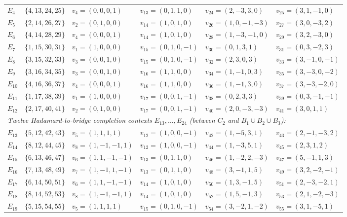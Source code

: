\documentclass[aps,pra,reprint,superscriptaddress,longbibliography,nofootinbib,floatfix,10pt]{revtex4-2}
\theoremstyle{definition}
\begin{document}
\begin{longtable}{llllll}
$E_4$  & $\{4,13,24,25\}$ & $v_4=(0,0,0,1)$ & $v_{13}=(0,1,1,0)$  & $v_{24}=(2,-3,3,0)$  & $v_{25}=(3,1,-1,0)$ \\
$E_5$  & $\{2,14,26,27\}$ & $v_2=(0,1,0,0)$ & $v_{14}=(1,0,1,0)$  & $v_{26}=(1,0,-1,-3)$ & $v_{27}=(3,0,-3,2)$ \\
$E_6$  & $\{4,14,28,29\}$ & $v_4=(0,0,0,1)$ & $v_{14}=(1,0,1,0)$  & $v_{28}=(1,-3,-1,0)$ & $v_{29}=(3,2,-3,0)$ \\
$E_7$  & $\{1,15,30,31\}$ & $v_1=(1,0,0,0)$ & $v_{15}=(0,1,0,-1)$ & $v_{30}=(0,1,3,1)$   & $v_{31}=(0,3,-2,3)$ \\
$E_8$  & $\{3,15,32,33\}$ & $v_3=(0,0,1,0)$ & $v_{15}=(0,1,0,-1)$ & $v_{32}=(2,3,0,3)$   & $v_{33}=(3,-1,0,-1)$ \\
$E_9$  & $\{3,16,34,35\}$ & $v_3=(0,0,1,0)$ & $v_{16}=(1,1,0,0)$  & $v_{34}=(1,-1,0,3)$  & $v_{35}=(3,-3,0,-2)$ \\
$E_{10}$ & $\{4,16,36,37\}$ & $v_4=(0,0,0,1)$ & $v_{16}=(1,1,0,0)$  & $v_{36}=(1,-1,3,0)$  & $v_{37}=(3,-3,-2,0)$ \\
$E_{11}$ & $\{1,17,38,39\}$ & $v_1=(1,0,0,0)$ & $v_{17}=(0,0,1,-1)$ & $v_{38}=(0,2,3,3)$   & $v_{39}=(0,3,-1,-1)$ \\
$E_{12}$ & $\{2,17,40,41\}$ & $v_2=(0,1,0,0)$ & $v_{17}=(0,0,1,-1)$ & $v_{40}=(2,0,-3,-3)$ & $v_{41}=(3,0,1,1)$ \\ \hline
\multicolumn{6}{l}{\emph{Twelve Hadamard-to-bridge completion contexts $E_{13},\ldots,E_{24}$ (between $C_2$ and $B_1\cup B_2\cup B_3$):}} \\
$E_{13}$ & $\{5,12,42,43\}$ & $v_5=(1,1,1,1)$    & $v_{12}=(1,0,0,-1)$ & $v_{42}=(1,-5,3,1)$   & $v_{43}=(2,-1,-3,2)$ \\
$E_{14}$ & $\{8,12,44,45\}$ & $v_8=(1,-1,-1,1)$  & $v_{12}=(1,0,0,-1)$ & $v_{44}=(1,-3,5,1)$   & $v_{45}=(2,3,1,2)$ \\
$E_{15}$ & $\{6,13,46,47\}$ & $v_6=(1,1,-1,-1)$  & $v_{13}=(0,1,1,0)$  & $v_{46}=(1,-2,2,-3)$  & $v_{47}=(5,-1,1,3)$ \\
$E_{16}$ & $\{7,13,48,49\}$ & $v_7=(1,-1,1,-1)$  & $v_{13}=(0,1,1,0)$  & $v_{48}=(3,-1,1,5)$   & $v_{49}=(3,2,-2,-1)$ \\*
$E_{17}$ & $\{6,14,50,51\}$ & $v_6=(1,1,-1,-1)$  & $v_{14}=(1,0,1,0)$  & $v_{50}=(1,3,-1,5)$   & $v_{51}=(2,-3,-2,1)$ \\*
$E_{18}$ & $\{8,14,52,53\}$ & $v_8=(1,-1,-1,1)$  & $v_{14}=(1,0,1,0)$  & $v_{52}=(1,5,-1,3)$   & $v_{53}=(2,1,-2,-3)$ \\*
$E_{19}$ & $\{5,15,54,55\}$ & $v_5=(1,1,1,1)$    & $v_{15}=(0,1,0,-1)$ & $v_{54}=(3,-2,1,-2)$  & $v_{55}=(3,1,-5,1)$ \\*

\end{longtable}
\end{document}
